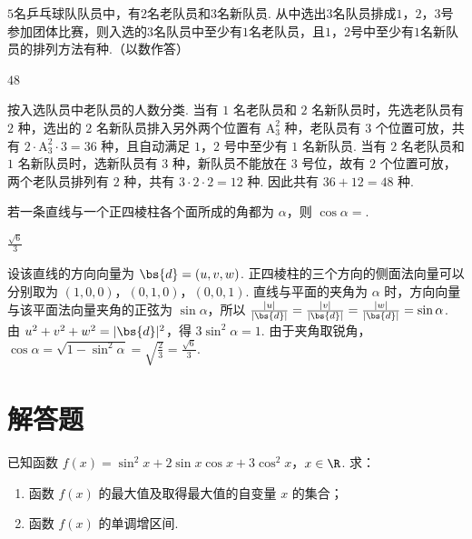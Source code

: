 \begin{problem}
\(5\)名乒乓球队队员中，有\(2\)名老队员和\(3\)名新队员. 从中选出\(3\)名队员排成\(1\)，\(2\)，\(3\)号参加团体比赛，则入选的\(3\)名队员中至少有\(1\)名老队员，且\(1\)，\(2\)号中至少有\(1\)名新队员的排列方法有\fillinblank{}种.（以数作答）
\end{problem}

\begin{answer}
\(48\)
\end{answer}

\begin{solution}
按入选队员中老队员的人数分类. 当有 \(1\) 名老队员和 \(2\) 名新队员时，先选老队员有 \(2\) 种，选出的 \(2\) 名新队员排入另外两个位置有 \(\mathrm A_3^2\) 种，老队员有 \(3\) 个位置可放，共有 \(2\cdot\mathrm A_3^2\cdot3=36\) 种，且自动满足 \(1\)，\(2\) 号中至少有 \(1\) 名新队员. 当有 \(2\) 名老队员和 \(1\) 名新队员时，选新队员有 \(3\) 种，新队员不能放在 \(3\) 号位，故有 \(2\) 个位置可放，两个老队员排列有 \(2\) 种，共有 \(3\cdot2\cdot2=12\) 种. 因此共有 \(36+12=48\) 种.
\end{solution}

\begin{problem}
若一条直线与一个正四棱柱各个面所成的角都为 \(\alpha\)，则 \(\cos \alpha = \)\fillinblank{}.
\end{problem}

\begin{answer}
\(\frac{\sqrt{6}}{3}\)
\end{answer}

\begin{solution}
设该直线的方向向量为 \(\bs{d}=(u,v,w)\). 正四棱柱的三个方向的侧面法向量可以分别取为 \((1,0,0)\)，\((0,1,0)\)，\((0,0,1)\). 直线与平面的夹角为 \(\alpha\) 时，方向向量与该平面法向量夹角的正弦为 \(\sin\alpha\)，所以 \(\frac{|u|}{|\bs{d}|}=\frac{|v|}{|\bs{d}|}=\frac{|w|}{|\bs{d}|}=\sin\alpha\). 由 \(u^2+v^2+w^2=|\bs{d}|^2\)，得 \(3\sin^2\alpha=1\). 由于夹角取锐角，\(\cos\alpha=\sqrt{1-\sin^2\alpha}=\sqrt{\frac23}=\frac{\sqrt6}{3}\).
\end{solution}

\section{解答题}
\begin{problem}
已知函数 \(f(x) = \sin^2 x + 2\sin x\cos x + 3 \cos^2 x\)，\(x \in \R\). 求：

\begin{enumerate}
\item 函数 \( f(x) \) 的最大值及取得最大值的自变量 \( x \) 的集合；
\item 函数 \( f(x) \) 的单调增区间.
\end{enumerate}
\end{problem}

